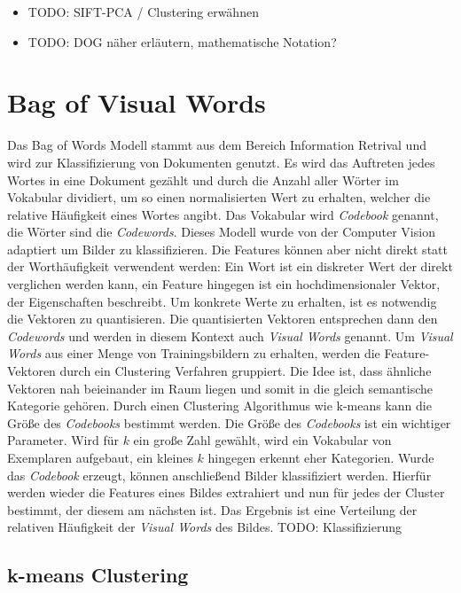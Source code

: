 \begin{itemize}
	\item TODO: SIFT-PCA / Clustering erwähnen
	\item TODO: DOG näher erläutern, mathematische Notation?
\end{itemize}

\section{Bag of Visual Words}

Das Bag of Words Modell stammt aus dem Bereich Information Retrival und wird zur Klassifizierung von Dokumenten genutzt. Es wird das Auftreten jedes Wortes in eine Dokument gezählt und durch die Anzahl aller Wörter im Vokabular dividiert, um so einen normalisierten Wert zu erhalten, welcher die relative Häufigkeit eines Wortes angibt. Das Vokabular wird \textit{Codebook} genannt, die Wörter sind die \textit{Codewords}.
Dieses Modell wurde von der Computer Vision adaptiert um Bilder zu klassifizieren. Die Features können aber nicht direkt statt der Worthäufigkeit verwendent werden: Ein Wort ist ein diskreter Wert der direkt verglichen werden kann, ein Feature hingegen ist ein hochdimensionaler Vektor, der Eigenschaften beschreibt. Um konkrete Werte zu erhalten, ist es notwendig die Vektoren zu quantisieren. Die quantisierten Vektoren entsprechen dann den \textit{Codewords} und werden in diesem Kontext auch \textit{Visual Words} genannt. Um \textit{Visual Words} aus einer Menge von Trainingsbildern zu erhalten, werden die Feature-Vektoren durch ein Clustering Verfahren gruppiert. Die Idee ist, dass ähnliche Vektoren nah beieinander im Raum liegen und somit in die gleich semantische Kategorie gehören. Durch einen Clustering Algorithmus wie k-means kann die Größe des \textit{Codebooks} bestimmt werden. Die Größe des \textit{Codebooks} ist ein wichtiger Parameter. Wird für $k$ ein große Zahl gewählt, wird ein Vokabular von Exemplaren aufgebaut, ein kleines $k$ hingegen erkennt eher Kategorien.
Wurde das \textit{Codebook} erzeugt, können anschließend Bilder klassifiziert werden. Hierfür werden wieder die Features eines Bildes extrahiert und nun für jedes der Cluster bestimmt, der diesem am nächsten ist. Das Ergebnis ist eine Verteilung der relativen Häufigkeit der \textit{Visual Words} des Bildes. TODO: Klassifizierung

\subsection{k-means Clustering}

